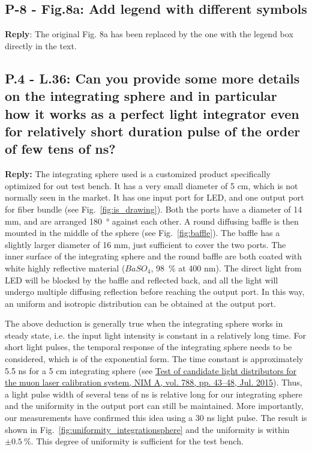 \documentclass[]{article}
\begin{document}
\subsection{P-8 - Fig.8a: Add legend with different symbols}
\textbf{Reply}:\newline
The original Fig. 8a has been replaced by the one with the legend box directly in the text.

\subsection{P.4 - L.36: Can you provide some more details on the integrating sphere and in particular how it works as a perfect light integrator even for relatively short duration pulse of the order of few tens of ns?}
\textbf{Reply:} \newline
The integrating sphere used is a customized product specifically optimized for out test bench. It has a very small diameter of 5 cm, which is not normally seen in the market. It has one input port for LED, and one output port for fiber bundle (see Fig.~\ref{fig:is_drawing}). Both the ports have a diameter of 14 mm, and are arranged \SI{180}{\degree} against each other. A round diffusing baffle is then mounted in the middle of the sphere (see Fig.~\ref{fig:baffle}). The baffle has a slightly larger diameter of 16 mm, just sufficient to cover the two ports. The inner surface of the integrating sphere and the round baffle are both coated with white highly reflective material ($BaSO_4$, \SI{98}{\percent} at 400 nm). The direct light from LED will be blocked by the baffle and reflected back, and all the light will undergo multiple diffusing reflection before reaching the output port. In this way, an uniform and isotropic distribution can be obtained at the output port.

The above deduction is generally true when the integrating sphere works in steady state, i.e. the input light intensity is constant in a relatively long time. For short light pulses, the temporal response of the integrating sphere needs to be considered, which is of the exponential form. The time constant is approximately 5.5 ns for a 5 cm integrating sphere (see \href{http://www.sciencedirect.com/science/article/pii/S016890021500426X/pdfft?md5=6c1ff96a0c12fd90667d756f698abbfc&pid=1-s2.0-S016890021500426X-main.pdf} {Test of candidate light distributors for the muon laser calibration system, NIM A, vol. 788, pp. 43–48, Jul. 2015}). Thus, a light pulse width of several tens of ns is relative long for our integrating sphere and the uniformity in the output port can still be maintained. More importantly, our measurements have confirmed this idea using a 30 ns light pulse.
The result is shown in Fig.~\ref{fig:uniformity_integrationsphere} and the uniformity is within $\pm\SI{0.5}{\percent}$. This degree of uniformity is sufficient for the test bench.
\end{document}
